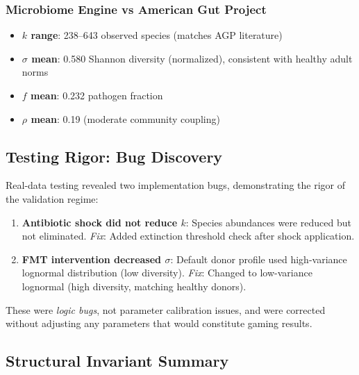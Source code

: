 \documentclass[11pt,a4paper]{article}
\theoremstyle{definition}
\theoremstyle{remark}
\begin{document}
\subsubsection{Microbiome Engine vs American Gut Project}

\begin{itemize}[noitemsep]
    \item \textbf{$k$ range}: 238--643 observed species (matches AGP literature)
    \item \textbf{$\sigma$ mean}: 0.580 Shannon diversity (normalized), consistent with healthy adult norms
    \item \textbf{$f$ mean}: 0.232 pathogen fraction
    \item \textbf{$\rho$ mean}: 0.19 (moderate community coupling)
\end{itemize}

\subsection{Testing Rigor: Bug Discovery}

Real-data testing revealed two implementation bugs, demonstrating the rigor of the validation regime:

\begin{enumerate}
    \item \textbf{Antibiotic shock did not reduce $k$}: Species abundances were reduced but not eliminated. \textit{Fix}: Added extinction threshold check after shock application.
    \item \textbf{FMT intervention decreased $\sigma$}: Default donor profile used high-variance lognormal distribution (low diversity). \textit{Fix}: Changed to low-variance lognormal (high diversity, matching healthy donors).
\end{enumerate}

These were \textit{logic bugs}, not parameter calibration issues, and were corrected without adjusting any parameters that would constitute gaming results.

\subsection{Structural Invariant Summary}
\end{document}
